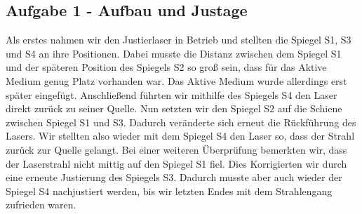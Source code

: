 \subsection{Aufgabe 1 - Aufbau und Justage}

Als erstes nahmen wir den Justierlaser in Betrieb und stellten die Spiegel S1, S3 und S4 an ihre Positionen. Dabei musste die Distanz zwischen dem Spiegel S1 und der späteren Position des Spiegels S2 so groß sein, dass für das Aktive Medium genug Platz vorhanden war. Das Aktive Medium wurde allerdings erst später eingefügt.
Anschließend führten wir mithilfe des Spiegels S4 den Laser direkt zurück zu seiner Quelle. Nun setzten wir den Spiegel S2 auf die Schiene zwischen Spiegel S1 und S3. Dadurch veränderte sich erneut die Rückführung des Lasers. Wir stellten also wieder mit dem Spiegel S4 den Laser so, dass der Strahl zurück zur Quelle gelangt. Bei einer weiteren Überprüfung bemerkten wir, dass der Laserstrahl nicht mittig auf den Spiegel S1 fiel. Dies Korrigierten wir durch eine erneute Justierung des Spiegels S3. Dadurch musste aber auch wieder der Spiegel S4 nachjustiert werden, bis wir letzten Endes mit dem Strahlengang zufrieden waren.
